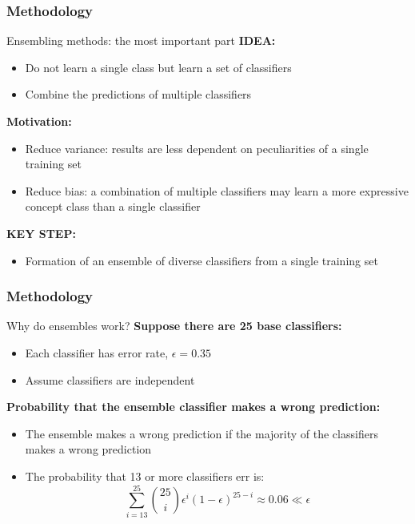 \documentclass[xcolor={x11names,svgnames,dvipsnames}]{beamer}
\begin{document}
\begin{frame}
\frametitle{Methodology}

	\begin{block}{Ensembling methods: the most important part}
		\textbf{IDEA:} 
			 \begin{itemize}
			 \item Do not learn a single class but learn a set of classifiers
			 \item Combine the predictions of multiple classifiers	 
			 \end{itemize}
		\textbf{Motivation:} 
			 \begin{itemize}
			 \item Reduce variance: results are less dependent on peculiarities of
			 a single training set
			 
			 \item Reduce bias: a combination of multiple classifiers may learn a
			 more expressive concept class than a single classifier
			 	 
			 \end{itemize}
		\textbf{ KEY STEP:} 
			 \begin{itemize}
			 \item  Formation of an ensemble of diverse classifiers from a
			 single training set			 
			 \end{itemize}


	\end{block}
\end{frame}



\begin{frame}
\frametitle{Methodology}

	\begin{block}{Why do ensembles work?}
		\textbf{Suppose there are 25 base classifiers:} 
			 \begin{itemize}
			 \item Each classifier has error rate, $\epsilon= 0.35$
			 
			 \item  Assume classifiers are independent
			 			 	 
			 \end{itemize}
		\textbf{Probability that the ensemble classifier makes a wrong
		prediction:} 
			 \begin{itemize}
			 \item The ensemble makes a wrong prediction if the majority of
			 the classifiers makes a wrong prediction
			 
			 
			 \item The probability that 13 or more classifiers err is:
			 \begin{equation*}
				 \sum_{i=13}^{25} {25 \choose i}\epsilon^i(1-\epsilon)^{25-i}\approx 0.06\ll \epsilon
			 \end{equation*}
			 \end{itemize}

	\end{block}
\end{frame}
\end{document}

